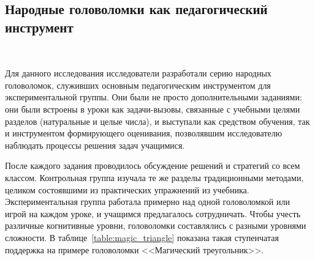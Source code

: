 \documentclass[a4paper,14pt]{extreport}
\theoremstyle{plain}
\theoremstyle{definition}
\theoremstyle{remark}
\begin{document}
\subsection{Народные головоломки как педагогический инструмент}~\label{sec4.3.5}

Для данного исследования исследователи разработали серию народных головоломок, служивших основным педагогическим инструментом для экспериментальной группы. Они были не просто дополнительными заданиями: они были встроены в уроки как задачи-вызовы, связанные с учебными целями разделов (натуральные и целые числа), и выступали как средством обучения, так и инструментом формирующего оценивания, позволявшим исследователю наблюдать процессы решения задач учащимися.

После каждого задания проводилось обсуждение решений и стратегий со всем классом. Контрольная группа изучала те же разделы традиционными методами, целиком состоявшими из практических упражнений из учебника. Экспериментальная группа работала примерно над одной головоломкой или игрой на каждом уроке, и учащимся предлагалось сотрудничать. Чтобы учесть различные когнитивные уровни, головоломки составлялись с разными уровнями сложности. В таблице~\ref{table:magic_triangle} показана такая ступенчатая поддержка на примере головоломки <<Магический треугольник>>.
\end{document}
